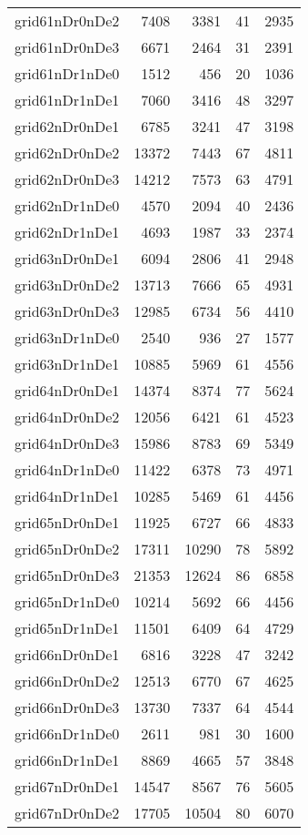 \begin{longtable}{lrrrr}
grid61nDr0nDe2 & 7408 & 3381 & 41 & 2935 \\
grid61nDr0nDe3 & 6671 & 2464 & 31 & 2391 \\
grid61nDr1nDe0 & 1512 & 456 & 20 & 1036 \\
grid61nDr1nDe1 & 7060 & 3416 & 48 & 3297 \\
grid62nDr0nDe1 & 6785 & 3241 & 47 & 3198 \\
grid62nDr0nDe2 & 13372 & 7443 & 67 & 4811 \\
grid62nDr0nDe3 & 14212 & 7573 & 63 & 4791 \\
grid62nDr1nDe0 & 4570 & 2094 & 40 & 2436 \\
grid62nDr1nDe1 & 4693 & 1987 & 33 & 2374 \\
grid63nDr0nDe1 & 6094 & 2806 & 41 & 2948 \\
grid63nDr0nDe2 & 13713 & 7666 & 65 & 4931 \\
grid63nDr0nDe3 & 12985 & 6734 & 56 & 4410 \\
grid63nDr1nDe0 & 2540 & 936 & 27 & 1577 \\
grid63nDr1nDe1 & 10885 & 5969 & 61 & 4556 \\
grid64nDr0nDe1 & 14374 & 8374 & 77 & 5624 \\
grid64nDr0nDe2 & 12056 & 6421 & 61 & 4523 \\
grid64nDr0nDe3 & 15986 & 8783 & 69 & 5349 \\
grid64nDr1nDe0 & 11422 & 6378 & 73 & 4971 \\
grid64nDr1nDe1 & 10285 & 5469 & 61 & 4456 \\
grid65nDr0nDe1 & 11925 & 6727 & 66 & 4833 \\
grid65nDr0nDe2 & 17311 & 10290 & 78 & 5892 \\
grid65nDr0nDe3 & 21353 & 12624 & 86 & 6858 \\
grid65nDr1nDe0 & 10214 & 5692 & 66 & 4456 \\
grid65nDr1nDe1 & 11501 & 6409 & 64 & 4729 \\
grid66nDr0nDe1 & 6816 & 3228 & 47 & 3242 \\
grid66nDr0nDe2 & 12513 & 6770 & 67 & 4625 \\
grid66nDr0nDe3 & 13730 & 7337 & 64 & 4544 \\
grid66nDr1nDe0 & 2611 & 981 & 30 & 1600 \\
grid66nDr1nDe1 & 8869 & 4665 & 57 & 3848 \\
grid67nDr0nDe1 & 14547 & 8567 & 76 & 5605 \\
grid67nDr0nDe2 & 17705 & 10504 & 80 & 6070 \\

\end{longtable}
